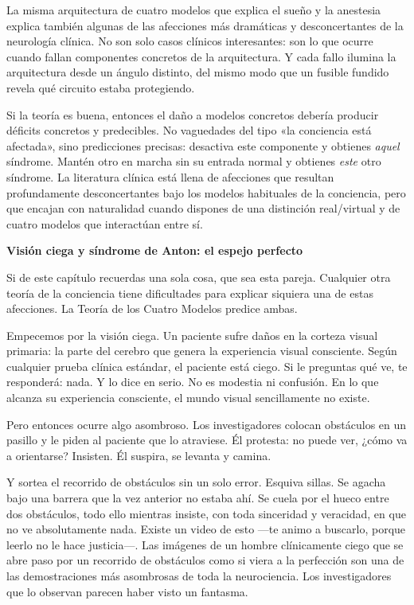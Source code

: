 \documentclass[11pt, twoside, openright]{book}
\begin{document}
La misma arquitectura de cuatro modelos que explica el sueño y la anestesia explica también algunas de las afecciones más dramáticas y desconcertantes de la neurología clínica. No son solo casos clínicos interesantes: son lo que ocurre cuando fallan componentes concretos de la arquitectura. Y cada fallo ilumina la arquitectura desde un ángulo distinto, del mismo modo que un fusible fundido revela qué circuito estaba protegiendo.

Si la teoría es buena, entonces el daño a modelos concretos debería producir déficits concretos y predecibles. No vaguedades del tipo «la conciencia está afectada», sino predicciones precisas: desactiva este componente y obtienes \textit{aquel} síndrome. Mantén otro en marcha sin su entrada normal y obtienes \textit{este} otro síndrome. La literatura clínica está llena de afecciones que resultan profundamente desconcertantes bajo los modelos habituales de la conciencia, pero que encajan con naturalidad cuando dispones de una distinción real/\allowbreak{}virtual y de cuatro modelos que interactúan entre sí.

\textbf{Visión ciega y síndrome de Anton: el espejo perfecto}

Si de este capítulo recuerdas una sola cosa, que sea esta pareja. Cualquier otra teoría de la conciencia tiene dificultades para explicar siquiera una de estas afecciones. La Teoría de los Cuatro Modelos predice ambas.

Empecemos por la visión ciega. Un paciente sufre daños en la corteza visual primaria: la parte del cerebro que genera la experiencia visual consciente. Según cualquier prueba clínica estándar, el paciente está ciego. Si le preguntas qué ve, te responderá: nada. Y lo dice en serio. No es modestia ni confusión. En lo que alcanza su experiencia consciente, el mundo visual sencillamente no existe.

Pero entonces ocurre algo asombroso. Los investigadores colocan obstáculos en un pasillo y le piden al paciente que lo atraviese. Él protesta: no puede ver, ¿cómo va a orientarse? Insisten. Él suspira, se levanta y camina.

Y sortea el recorrido de obstáculos sin un solo error. Esquiva sillas. Se agacha bajo una barrera que la vez anterior no estaba ahí. Se cuela por el hueco entre dos obstáculos, todo ello mientras insiste, con toda sinceridad y veracidad, en que no ve absolutamente nada. Existe un video de esto ---te animo a buscarlo, porque leerlo no le hace justicia---. Las imágenes de un hombre clínicamente ciego que se abre paso por un recorrido de obstáculos como si viera a la perfección son una de las demostraciones más asombrosas de toda la neurociencia. Los investigadores que lo observan parecen haber visto un fantasma.
\end{document}
